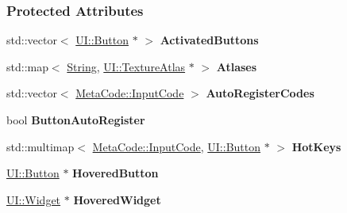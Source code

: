 \subsubsection*{Protected Attributes}
\begin{DoxyCompactItemize}
\item 
\hypertarget{classMezzanine_1_1UIManager_afc8f4929c4ebd442c56abd1ee80ca841}{
std::vector$<$ \hyperlink{classMezzanine_1_1UI_1_1Button}{UI::Button} $\ast$ $>$ {\bfseries ActivatedButtons}}
\label{classMezzanine_1_1UIManager_afc8f4929c4ebd442c56abd1ee80ca841}

\item 
\hypertarget{classMezzanine_1_1UIManager_ab3da97dd3bcd7b791252f71ae611c5a5}{
std::map$<$ \hyperlink{namespaceMezzanine_acf9fcc130e6ebf08e3d8491aebcf1c86}{String}, \hyperlink{classMezzanine_1_1UI_1_1TextureAtlas}{UI::TextureAtlas} $\ast$ $>$ {\bfseries Atlases}}
\label{classMezzanine_1_1UIManager_ab3da97dd3bcd7b791252f71ae611c5a5}

\item 
\hypertarget{classMezzanine_1_1UIManager_a362c2799989a67d06a461dfbd2bab84a}{
std::vector$<$ \hyperlink{classMezzanine_1_1MetaCode_a3b5633f0145bf3287cf53a3f05b5563c}{MetaCode::InputCode} $>$ {\bfseries AutoRegisterCodes}}
\label{classMezzanine_1_1UIManager_a362c2799989a67d06a461dfbd2bab84a}

\item 
\hypertarget{classMezzanine_1_1UIManager_acc3062c3692ab87358783f647dd23b94}{
bool {\bfseries ButtonAutoRegister}}
\label{classMezzanine_1_1UIManager_acc3062c3692ab87358783f647dd23b94}

\item 
\hypertarget{classMezzanine_1_1UIManager_a5c47b882402fe1db04b1aa988cc2ce1d}{
std::multimap$<$ \hyperlink{classMezzanine_1_1MetaCode_a3b5633f0145bf3287cf53a3f05b5563c}{MetaCode::InputCode}, \hyperlink{classMezzanine_1_1UI_1_1Button}{UI::Button} $\ast$ $>$ {\bfseries HotKeys}}
\label{classMezzanine_1_1UIManager_a5c47b882402fe1db04b1aa988cc2ce1d}

\item 
\hypertarget{classMezzanine_1_1UIManager_add654b26cd0824c9020794bea7dfd1f5}{
\hyperlink{classMezzanine_1_1UI_1_1Button}{UI::Button} $\ast$ {\bfseries HoveredButton}}
\label{classMezzanine_1_1UIManager_add654b26cd0824c9020794bea7dfd1f5}

\item 
\hypertarget{classMezzanine_1_1UIManager_a60b60d5e81b1941a70d35e19f4a138e3}{
\hyperlink{classMezzanine_1_1UI_1_1Widget}{UI::Widget} $\ast$ {\bfseries HoveredWidget}}
\label{classMezzanine_1_1UIManager_a60b60d5e81b1941a70d35e19f4a138e3}


\end{DoxyCompactItemize}
